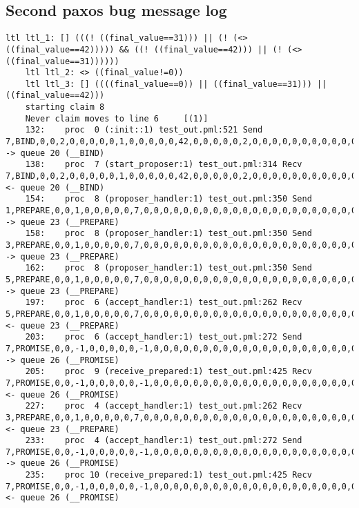 \subsection{Second paxos bug message log}
\begin{lstlisting}[xleftmargin=.01\linewidth, xrightmargin=0.01\linewidth, caption={Message passing caused by the proposer's protocol bug.}, label={lst:paxos_bug}]
    ltl ltl_1: [] (((! ((final_value==31))) || (! (<> ((final_value==42))))) && ((! ((final_value==42))) || (! (<> ((final_value==31))))))
    ltl ltl_2: <> ((final_value!=0))
    ltl ltl_3: [] ((((final_value==0)) || ((final_value==31))) || ((final_value==42)))
    starting claim 8
    Never claim moves to line 6     [(1)]
    132:    proc  0 (:init::1) test_out.pml:521 Send 7,BIND,0,0,2,0,0,0,0,0,1,0,0,0,0,0,42,0,0,0,0,0,2,0,0,0,0,0,0,0,0,0,0,0,0,0,0,0        -> queue 20 (__BIND)
    138:    proc  7 (start_proposer:1) test_out.pml:314 Recv 7,BIND,0,0,2,0,0,0,0,0,1,0,0,0,0,0,42,0,0,0,0,0,2,0,0,0,0,0,0,0,0,0,0,0,0,0,0,0        <- queue 20 (__BIND)
    154:    proc  8 (proposer_handler:1) test_out.pml:350 Send 1,PREPARE,0,0,1,0,0,0,0,0,7,0,0,0,0,0,0,0,0,0,0,0,0,0,0,0,0,0,0,0,0,0,0,0,0,0,0,0    -> queue 23 (__PREPARE)
    158:    proc  8 (proposer_handler:1) test_out.pml:350 Send 3,PREPARE,0,0,1,0,0,0,0,0,7,0,0,0,0,0,0,0,0,0,0,0,0,0,0,0,0,0,0,0,0,0,0,0,0,0,0,0    -> queue 23 (__PREPARE)
    162:    proc  8 (proposer_handler:1) test_out.pml:350 Send 5,PREPARE,0,0,1,0,0,0,0,0,7,0,0,0,0,0,0,0,0,0,0,0,0,0,0,0,0,0,0,0,0,0,0,0,0,0,0,0    -> queue 23 (__PREPARE)
    197:    proc  6 (accept_handler:1) test_out.pml:262 Recv 5,PREPARE,0,0,1,0,0,0,0,0,7,0,0,0,0,0,0,0,0,0,0,0,0,0,0,0,0,0,0,0,0,0,0,0,0,0,0,0      <- queue 23 (__PREPARE)
    203:    proc  6 (accept_handler:1) test_out.pml:272 Send 7,PROMISE,0,0,-1,0,0,0,0,0,-1,0,0,0,0,0,0,0,0,0,0,0,0,0,0,0,0,0,0,0,0,0,0,0,0,0,0,0    -> queue 26 (__PROMISE)
    205:    proc  9 (receive_prepared:1) test_out.pml:425 Recv 7,PROMISE,0,0,-1,0,0,0,0,0,-1,0,0,0,0,0,0,0,0,0,0,0,0,0,0,0,0,0,0,0,0,0,0,0,0,0,0,0  <- queue 26 (__PROMISE)
    227:    proc  4 (accept_handler:1) test_out.pml:262 Recv 3,PREPARE,0,0,1,0,0,0,0,0,7,0,0,0,0,0,0,0,0,0,0,0,0,0,0,0,0,0,0,0,0,0,0,0,0,0,0,0      <- queue 23 (__PREPARE)
    233:    proc  4 (accept_handler:1) test_out.pml:272 Send 7,PROMISE,0,0,-1,0,0,0,0,0,-1,0,0,0,0,0,0,0,0,0,0,0,0,0,0,0,0,0,0,0,0,0,0,0,0,0,0,0    -> queue 26 (__PROMISE)
    235:    proc 10 (receive_prepared:1) test_out.pml:425 Recv 7,PROMISE,0,0,-1,0,0,0,0,0,-1,0,0,0,0,0,0,0,0,0,0,0,0,0,0,0,0,0,0,0,0,0,0,0,0,0,0,0  <- queue 26 (__PROMISE)

\end{lstlisting}
